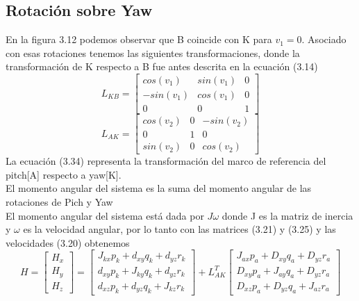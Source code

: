 \subsection{Rotación sobre Yaw}
En la figura 3.12 podemos observar que B coincide con K para $v_1 = 0$. Asociado con esas rotaciones
tenemos las siguientes transformaciones, donde la transformación de K respecto a B fue antes descrita en la ecuación (3.14)
\begin{equation}
	L_{KB} =
	\begin{bmatrix}
		cos(v_1)  & sin(v_1) & 0 \\
		-sin(v_1) & cos(v_1) & 0 \\
		0         & 0        & 1
	\end{bmatrix}
\end{equation}
\begin{equation}
	L_{AK} =
	\begin{bmatrix}
		cos(v_2) & 0 & -sin(v_2) \\
		0        & 1 & 0         \\
		sin(v_2) & 0 & cos(v_2)
	\end{bmatrix}
\end{equation}
La ecuación (3.34) representa la transformación del marco de referencia del pitch[A] respecto a yaw[K].\\
El momento angular del sistema es la suma del momento angular de las rotaciones
de Pich y Yaw \cite{Paper::Yoon2001}\\
El momento angular del sistema está dada por $J\omega$ donde J es la matriz de inercia y $\omega$
es la velocidad angular, por lo tanto con las matrices (3.21) y (3.25) y las velocidades (3.20)
obtenemos
\begin{equation}
	H =
	\begin{bmatrix}
		H_x \\
		H_y \\
		H_z
	\end{bmatrix}
	=
	\begin{bmatrix}
		J_{kx}p_k + d_{xy}q_k + d_{yz}r_k \\
		d_{xy}p_k + J_{ky}q_k + d_{yz}r_k \\
		d_{xz}p_k + d_{yz}q_k + J_{kz}r_k
	\end{bmatrix}
	+L^T_{AK}
	\begin{bmatrix}
		J_{ax}p_a + D_{xy}q_a + D_{yz}r_a \\
		D_{xy}p_a + J_{ay}q_a + D_{yz}r_a \\
		D_{xz}p_a + D_{yz}q_a + J_{az}r_a
	\end{bmatrix}
\end{equation}
